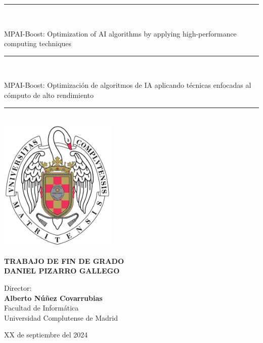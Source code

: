 \begin{titlepage}
	\thispagestyle{empty}
	
	\begin{center}
		
		\vspace{1cm}
		
		\vspace{0.65cm}
		\rule{2in}{0.5pt}\\
		\vspace{0.85cm}
		
		{\Large MPAI-Boost: Optimization of AI algorithms by applying high-performance computing techniques}\\
		
		\vspace{0.65cm}
		\rule{2in}{0.5pt}\\
		\vspace{0.85cm}
		
		{\Large MPAI-Boost: Optimización de algoritmos de IA aplicando técnicas enfocadas al cómputo de alto rendimiento}\\
		
		\vspace{0.65cm}
		\rule{2in}{0.5pt}\\
		
		
		
		\vfill
		\includegraphics[height=2.5in]{images/escudo_ucm.pdf}
		\vfill
		
		
		
		\textbf{TRABAJO DE FIN DE GRADO}\\
		\vspace{0.7cm}
		\textbf{DANIEL PIZARRO GALLEGO}
		
		\vspace{1cm}
		
		Director:\\
		\textbf{Alberto Núñez Covarrubias}\\
		
		\vspace{1.8cm}
		Facultad de Informática\\
		Universidad Complutense de Madrid
		\vspace{0.5cm}
		
		XX de septiembre del 2024
		
		\vspace{0.2cm}
		
	\end{center}
\end{titlepage}